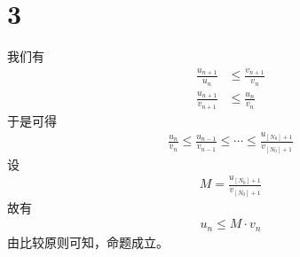\documentclass{article}
\begin{document}
\section*{3}



我们有
\begin{align*}
  \frac{u_{n + 1}}{u_n}       & \leq \frac{v_{n + 1}}{v_n} \\
  \frac{u_{n + 1}}{v_{n + 1}} & \leq \frac{u_n}{v_n}
\end{align*}
于是可得
\begin{align*}
  \frac{u_n}{v_n} \leq \frac{u_{n - 1}}{v_{n - 1}} \leq \cdots \leq \frac{u_{[N_0] + 1}}{v_{[N_0] + 1}}
\end{align*}
设
\begin{align*}
  M = \frac{u_{[N_0] + 1}}{v_{[N_0] + 1}}
\end{align*}
故有
\begin{align*}
  u_n \leq M \cdot v_n
\end{align*}
由比较原则可知，命题成立。
\end{document}
